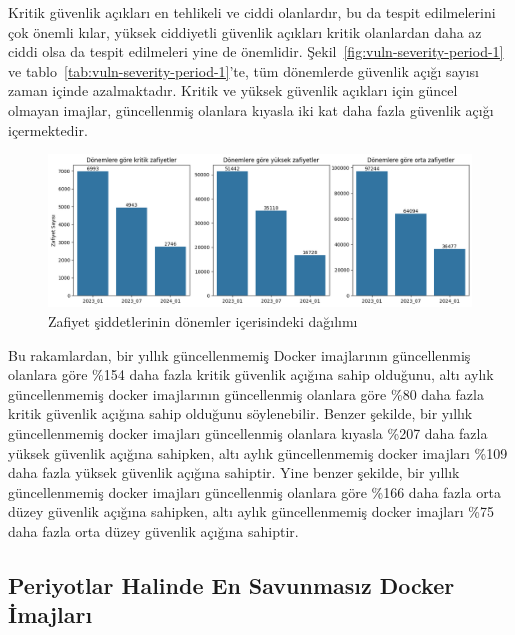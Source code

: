 Kritik güvenlik açıkları en tehlikeli ve ciddi olanlardır, bu da tespit edilmelerini çok önemli kılar, yüksek ciddiyetli güvenlik açıkları kritik olanlardan daha az ciddi olsa da tespit edilmeleri yine de önemlidir. Şekil~\ref{fig:vuln-severity-period-1} ve tablo~\ref{tab:vuln-severity-period-1}'te, tüm dönemlerde güvenlik açığı sayısı zaman içinde azalmaktadır. Kritik ve yüksek güvenlik açıkları için güncel olmayan imajlar, güncellenmiş olanlara kıyasla iki kat daha fazla güvenlik açığı içermektedir.

\begin{figure}[!htbp]
    \centering
    \includegraphics[width=1\linewidth]{images/s2/severity-over-periods.png}
    \caption{Zafiyet şiddetlerinin dönemler içerisindeki dağılımı}\label{fig:severity-over-periods}
\end{figure}

Bu rakamlardan, bir yıllık güncellenmemiş Docker imajlarının güncellenmiş olanlara göre \%154 daha fazla kritik güvenlik açığına sahip olduğunu, altı aylık güncellenmemiş docker imajlarının güncellenmiş olanlara göre \%80 daha fazla kritik güvenlik açığına sahip olduğunu söylenebilir. Benzer şekilde, bir yıllık güncellenmemiş docker imajları güncellenmiş olanlara kıyasla \%207 daha fazla yüksek güvenlik açığına sahipken, altı aylık güncellenmemiş docker imajları \%109 daha fazla yüksek güvenlik açığına sahiptir. Yine benzer şekilde, bir yıllık güncellenmemiş docker imajları güncellenmiş olanlara göre \%166 daha fazla orta düzey güvenlik açığına sahipken, altı aylık güncellenmemiş docker imajları \%75 daha fazla orta düzey güvenlik açığına sahiptir.


\subsection{Periyotlar Halinde En Savunmasız Docker İmajları}\label{subsec:most-vuln-images-in-periods}

